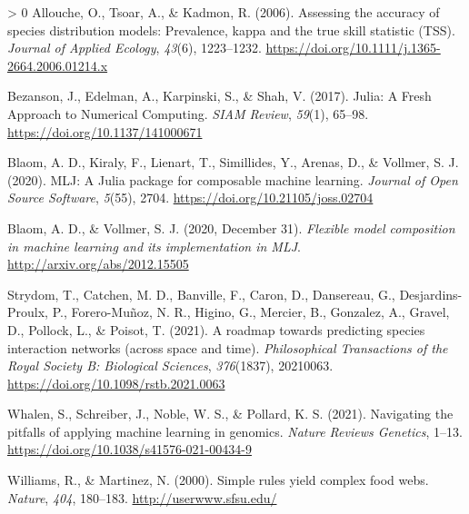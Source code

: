 \documentclass[11pt]{article}
\newlength{\cslhangindent}
\newenvironment{CSLReferences}[3] %
 {%
  \setlength{\parindent}{0pt}
  \ifodd #1 \everypar{\setlength{\hangindent}{\cslhangindent}}\ignorespaces\fi
  \ifnum #2 > 0
  \setlength{\parskip}{#2\baselineskip}
  \fi
 }%
 {}
\begin{document}
\hypertarget{refs}{}
\begin{CSLReferences}{1}{0}
\leavevmode\hypertarget{ref-Allouche2006AssAcc}{}%
Allouche, O., Tsoar, A., \& Kadmon, R. (2006). Assessing the accuracy of
species distribution models: Prevalence, kappa and the true skill
statistic (TSS). \emph{Journal of Applied Ecology}, \emph{43}(6),
1223--1232. \url{https://doi.org/10.1111/j.1365-2664.2006.01214.x}

\leavevmode\hypertarget{ref-Bezanson2017JulFre}{}%
Bezanson, J., Edelman, A., Karpinski, S., \& Shah, V. (2017). Julia: A
Fresh Approach to Numerical Computing. \emph{SIAM Review}, \emph{59}(1),
65--98. \url{https://doi.org/10.1137/141000671}

\leavevmode\hypertarget{ref-Blaom2020MljJul}{}%
Blaom, A. D., Kiraly, F., Lienart, T., Simillides, Y., Arenas, D., \&
Vollmer, S. J. (2020). MLJ: A Julia package for composable machine
learning. \emph{Journal of Open Source Software}, \emph{5}(55), 2704.
\url{https://doi.org/10.21105/joss.02704}

\leavevmode\hypertarget{ref-Blaom2020FleMod}{}%
Blaom, A. D., \& Vollmer, S. J. (2020, December 31). \emph{Flexible
model composition in machine learning and its implementation in MLJ}.
\url{http://arxiv.org/abs/2012.15505}

\leavevmode\hypertarget{ref-Strydom2021RoaPre}{}%
Strydom, T., Catchen, M. D., Banville, F., Caron, D., Dansereau, G.,
Desjardins-Proulx, P., Forero-Muñoz, N. R., Higino, G., Mercier, B.,
Gonzalez, A., Gravel, D., Pollock, L., \& Poisot, T. (2021). A roadmap
towards predicting species interaction networks (across space and time).
\emph{Philosophical Transactions of the Royal Society B: Biological
Sciences}, \emph{376}(1837), 20210063.
\url{https://doi.org/10.1098/rstb.2021.0063}

\leavevmode\hypertarget{ref-Whalen2021NavPit}{}%
Whalen, S., Schreiber, J., Noble, W. S., \& Pollard, K. S. (2021).
Navigating the pitfalls of applying machine learning in genomics.
\emph{Nature Reviews Genetics}, 1--13.
\url{https://doi.org/10.1038/s41576-021-00434-9}

\leavevmode\hypertarget{ref-Williams2000SimRul}{}%
Williams, R., \& Martinez, N. (2000). Simple rules yield complex food
webs. \emph{Nature}, \emph{404}, 180--183.
\href{http://userwww.sfsu.edu/\%20}{http://userwww.sfsu.edu/}

\end{CSLReferences}
\end{document}
